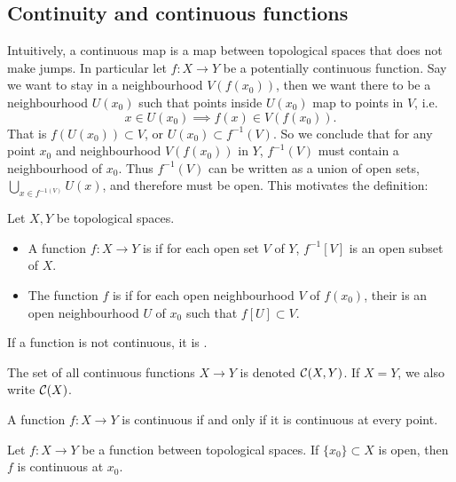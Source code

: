 \subsection{Continuity and continuous functions}
Intuitively, a continuous map is a map between topological spaces that does not make jumps. In particular let $f: X\to Y$ be a potentially continuous function. Say we want to stay in a neighbourhood $V(f(x_0))$, then we want there to be a neighbourhood $U(x_0)$ such that points inside $U(x_0)$ map to points in $V$, i.e.\
\[ x\in U(x_0) \implies f(x) \in V(f(x_0)). \]
That is $f(U(x_0)) \subset V$, or $U(x_0)\subset f^{-1}(V)$. So we conclude that for any point $x_0$ and neighbourhood $V(f(x_0))$ in $Y$, $f^{-1}(V)$ must contain a neighbourhood of $x_0$. Thus $f^{-1}(V)$ can be written as a union of open sets, $\bigcup_{x\in f^{-1(V)}}U(x)$, and therefore must be open. This motivates the definition:
\begin{definition}
Let $X,Y$ be topological spaces.
\begin{itemize}
\item A function $f:X\to Y$ is  if for each open set $V$ of $Y$, $f^{-1}[V]$ is an open subset of $X$.
\item The function $f$ is \udef{continuous at $x_0$} if for each open neighbourhood $V$ of $f(x_0)$, their is an open neighbourhood $U$ of $x_0$ such that $f[U]\subset V$.
\end{itemize}
If a function is not continuous, it is .

The set of all continuous functions $X\to Y$ is denoted $\operatorname{\mathcal{C}}(X,Y)$. If $X=Y$, we also write $\operatorname{\mathcal{C}}(X)$.
\end{definition}
\begin{lemma} \label{globalContinuityFromAllPoints}
A function $f:X\to Y$ is continuous \textup{if and only if} it is continuous at every point.
\end{lemma}

\begin{lemma} \label{continuityAtIsolatedPoint}
Let $f:X\to Y$ be a function between topological spaces. If $\{x_0\}\subset X$ is open, then $f$ is continuous at $x_0$.
\end{lemma}


